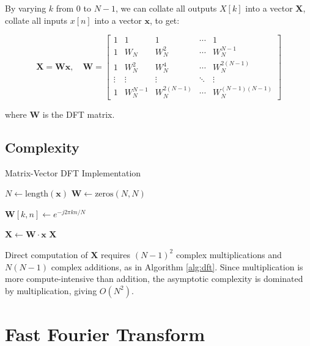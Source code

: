 \documentclass[8pt]{extarticle}
\begin{document}
By varying $k$ from $0$ to $N-1$, we can collate all outputs ${X[k]}$ into a vector $\mathbf{X}$, collate all inputs $x[n]$ into a vector $\mathbf{x}$, to get:

\begin{equation}
    \mathbf{X}=\mathbf{W}\mathbf{x}, \quad
\mathbf{W} = 
\begin{bmatrix}
1 & 1 & 1 & \cdots & 1 \\
1 & W_N & W_N^2 & \cdots & W_N^{N-1} \\
1 & W_N^2 & W_N^4 & \cdots & W_N^{2(N-1)} \\
\vdots & \vdots & \vdots & \ddots & \vdots \\
1 & W_N^{N-1} & W_N^{2(N-1)} & \cdots & W_N^{(N-1)(N-1)}
\end{bmatrix}
\end{equation}

where $\mathbf{W}$ is the DFT matrix.

\subsection{Complexity}

\begin{algorithm}
\caption{Matrix-Vector DFT Implementation}
\begin{algorithmic}[1]
    \State $N \gets \text{length}(\mathbf{x})$
    \State $\mathbf{W} \gets \text{zeros}(N, N)$ 
    
            \State $\mathbf{W}[k,n] \gets e^{-j2\pi kn/N}$
        \EndFor
    \EndFor
    
    \State $\mathbf{X} \gets \mathbf{W} \cdot \mathbf{x}$ 
    \State \Return $\mathbf{X}$
\EndFunction
\end{algorithmic}
\label{alg:dft}
\end{algorithm}

Direct computation of $\mathbf{X}$ requires $(N-1)^2$ complex multiplications and $N(N-1)$ complex additions, as in Algorithm \autoref{alg:dft}. Since multiplication is more compute-intensive than addition, the asymptotic complexity is dominated by multiplication, giving $O(N^2)$.

\section{Fast Fourier Transform}
\end{document}
